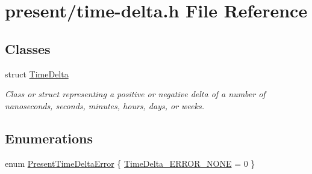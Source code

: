 \hypertarget{time-delta_8h}{\section{present/time-\/delta.h \-File \-Reference}
\label{time-delta_8h}
}
\subsection*{\-Classes}
\begin{DoxyCompactItemize}
\item 
struct \hyperlink{structTimeDelta}{\-Time\-Delta}
\begin{DoxyCompactList}\small\item\em \-Class or struct representing a positive or negative delta of a number of nanoseconds, seconds, minutes, hours, days, or weeks. \end{DoxyCompactList}\end{DoxyCompactItemize}
\subsection*{\-Enumerations}
\begin{DoxyCompactItemize}
\item 
enum \hyperlink{time-delta_8h_a6090105e9137c36754994cda35937b59}{\-Present\-Time\-Delta\-Error} \{ \hyperlink{time-delta_8h_a6090105e9137c36754994cda35937b59a61286fb07f463a3add14112870d9f834}{\-Time\-Delta\-\_\-\-E\-R\-R\-O\-R\-\_\-\-N\-O\-N\-E} =  0
 \}
\end{DoxyCompactItemize}
